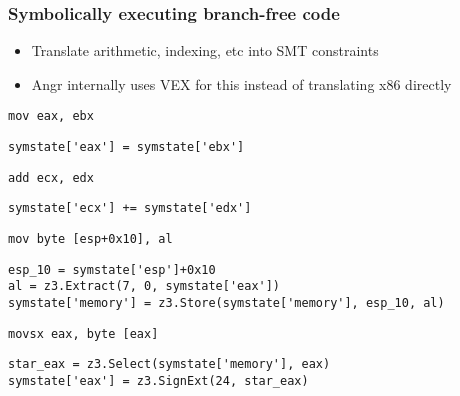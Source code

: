 \documentclass[aspectratio=169]{beamer}
\begin{document}
\begin{frame}[fragile]
\frametitle{Symbolically executing branch-free code}
\begin{itemize}
\item Translate arithmetic, indexing, etc into SMT constraints
\item Angr internally uses VEX for this instead of translating x86 directly
\end{itemize}
\begin{minipage}{0.3\textwidth}
\begin{Verbatim}[fontsize=\scriptsize, frame=single]
mov eax, ebx
\end{Verbatim}
\end{minipage}
\begin{minipage}{0.68\textwidth}
\begin{Verbatim}[fontsize=\scriptsize, frame=single]
symstate['eax'] = symstate['ebx']
\end{Verbatim}
\end{minipage}

\begin{minipage}{0.3\textwidth}
\begin{Verbatim}[fontsize=\scriptsize, frame=single]
add ecx, edx
\end{Verbatim}
\end{minipage}
\begin{minipage}{0.68\textwidth}
\begin{Verbatim}[fontsize=\scriptsize, frame=single]
symstate['ecx'] += symstate['edx']
\end{Verbatim}
\end{minipage}

\begin{minipage}{0.3\textwidth}
\begin{Verbatim}[fontsize=\scriptsize, frame=single]
mov byte [esp+0x10], al
\end{Verbatim}
\end{minipage}
\begin{minipage}{0.68\textwidth}
\begin{Verbatim}[fontsize=\scriptsize, frame=single]
esp_10 = symstate['esp']+0x10
al = z3.Extract(7, 0, symstate['eax'])
symstate['memory'] = z3.Store(symstate['memory'], esp_10, al)
\end{Verbatim}
\end{minipage}

\begin{minipage}{0.3\textwidth}
\begin{Verbatim}[fontsize=\scriptsize, frame=single]
movsx eax, byte [eax]
\end{Verbatim}
\end{minipage}
\begin{minipage}{0.68\textwidth}
\begin{Verbatim}[fontsize=\scriptsize, frame=single]
star_eax = z3.Select(symstate['memory'], eax)
symstate['eax'] = z3.SignExt(24, star_eax)
\end{Verbatim}
\end{minipage}
\end{frame}
\end{document}
